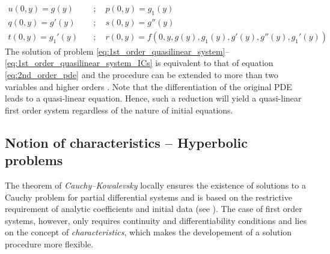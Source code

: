 \begin{equation}
  \label{eq:1st_order_quasilinear_system_ICs}
  \begin{aligned}
    u(0,y) = g(y) \quad & ; \quad     p(0,y) = g_1(y) \\
    q(0,y) = g'(y) \quad & ; \quad    s(0,y) = g''(y) \\
    t(0,y) = g_1'(y) \quad & ; \quad    r(0,y) = f(0,y,g(y),g_1(y),g'(y),g''(y),g_1'(y))
  \end{aligned}
\end{equation}
The solution of problem \ref{eq:1st_order_quasilinear_system}--\ref{eq:1st_order_quasilinear_system_ICs}  is equivalent to that of equation \ref{eq:2nd_order_pde} and the procedure can be extended to more than two variables and higher orders \cite[p.54]{PDEs}. Note that the differentiation of the original PDE leads to a quasi-linear equation. Hence, such a reduction will yield a quasi-linear first order system regardless of the nature of initial equations.

\subsection{Notion of characteristics -- Hyperbolic problems}
The theorem of \textit{Cauchy--Kowalevsky} locally ensures the existence of solutions to a Cauchy problem for partial differential systems and is based on the restrictive requirement of analytic coefficients and initial data (see \cite[p.46]{PDEs}). The case of first order systems, however, only requires continuity and differentiability conditions and lies on the concept of \textit{characteristics}, which makes the developement of a solution procedure more flexible.

